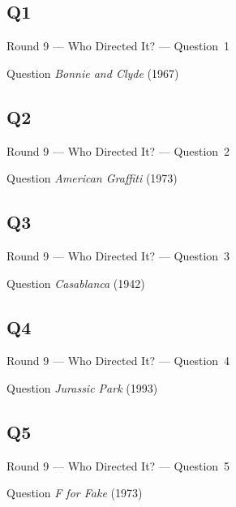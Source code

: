 \documentclass[11pt]{beamer}
\begin{document}
\subsection*{Q1}
\begin{frame}[t]{Round 9 --- Who Directed It? --- \mbox{Question 1}}
\vspace{-0.5em}
\begin{block}{Question}
\emph{Bonnie and Clyde} (1967)
\end{block}
\end{frame}
\subsection*{Q2}
\begin{frame}[t]{Round 9 --- Who Directed It? --- \mbox{Question 2}}
\vspace{-0.5em}
\begin{block}{Question}
\emph{American Graffiti} (1973)
\end{block}
\end{frame}
\subsection*{Q3}
\begin{frame}[t]{Round 9 --- Who Directed It? --- \mbox{Question 3}}
\vspace{-0.5em}
\begin{block}{Question}
\emph{Casablanca} (1942)
\end{block}
\end{frame}
\subsection*{Q4}
\begin{frame}[t]{Round 9 --- Who Directed It? --- \mbox{Question 4}}
\vspace{-0.5em}
\begin{block}{Question}
\emph{Jurassic Park} (1993)
\end{block}
\end{frame}
\subsection*{Q5}
\begin{frame}[t]{Round 9 --- Who Directed It? --- \mbox{Question 5}}
\vspace{-0.5em}
\begin{block}{Question}
\emph{F for Fake} (1973)
\end{block}
\end{frame}
\end{document}
